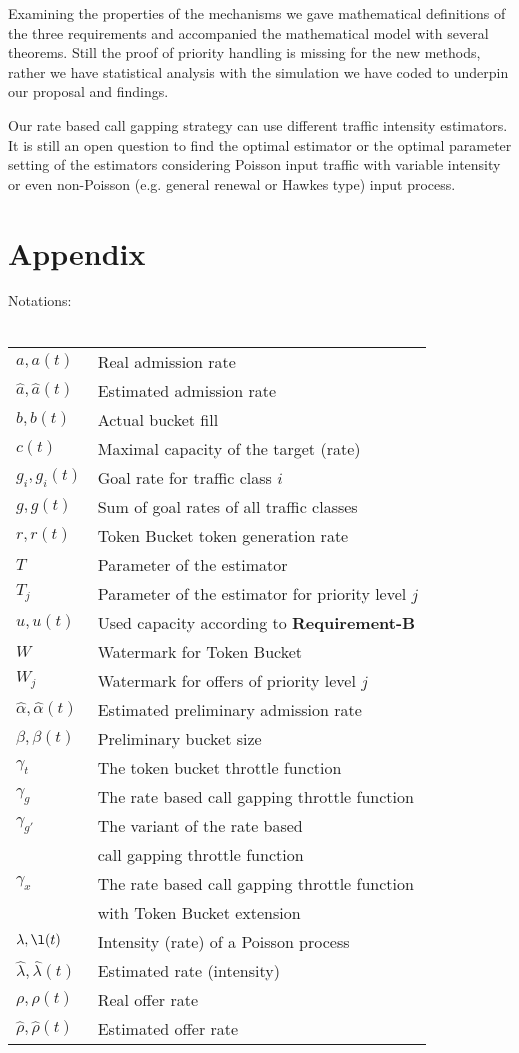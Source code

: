 \documentclass[conference]{IEEEtran}
\newcommand{\hl}{\hat{\lambda}}
\newcommand{\hr}{\hat{\rho}}
\newcommand{\ha}{\hat{\alpha}}
\newcommand{\haa}{\hat{a}}
\newcommand{\reqB}{\textbf{Requirement-B}}
\begin{document}
Examining the properties of the mechanisms we gave mathematical
definitions of the three requirements and accompanied the
mathematical model with several theorems. Still the proof of
priority handling is missing for the new methods, rather we have
statistical analysis with the simulation we have coded to underpin
our proposal and findings.

Our rate based call gapping strategy can use different traffic
intensity estimators. It is still an open question to find the
optimal estimator or the optimal parameter setting of the estimators
considering Poisson input traffic with variable intensity or even
non-Poisson (e.g. general renewal or Hawkes type) input process.


\section{Appendix}
Notations:\\
\\
\begin{tabular}{|l|l|}
  \hline
$a,a(t)$ & Real admission rate\\
  $\hat{a},\haa(t)$ & Estimated admission rate\\
  $b,b(t)$ & Actual bucket fill\\
  $c(t)$ & Maximal capacity of the target (rate)\\
  $g_i,g_i(t)$ & Goal rate for traffic class $i$\\
  $g,g(t)$ & Sum of goal rates of all traffic classes\\
  $r, r(t)$ & Token Bucket token generation rate\\
  $T$ & Parameter of the estimator\\
  $T_j$ & Parameter of the estimator for priority level $j$\\
  $u,u(t)$ & Used capacity according to \reqB\\
  $W$ & Watermark for Token Bucket\\
  $W_j$ & Watermark for offers of priority level $j$\\
  $\hat{\alpha},\ha(t)$ & Estimated preliminary admission rate\\
  $\beta,\beta(t)$ & Preliminary bucket size \\
  $\gamma_t$ & The token bucket throttle function\\
  $\gamma_g$ & The rate based call gapping throttle function\\
  $\gamma_{g'}$ & The variant of the rate based\\
  & call gapping throttle function\\
  $\gamma_x$ & The rate based call gapping throttle function\\
  & with Token Bucket extension\\
  $\lambda,\l(t)$ & Intensity (rate) of a Poisson process\\
  $\hat{\lambda},\hl(t)$ & Estimated rate (intensity)\\
  $\rho,\rho(t)$ & Real offer rate\\
  $\hat{\rho},\hr(t)$ & Estimated offer rate\\
  \hline
\end{tabular}
\end{document}
